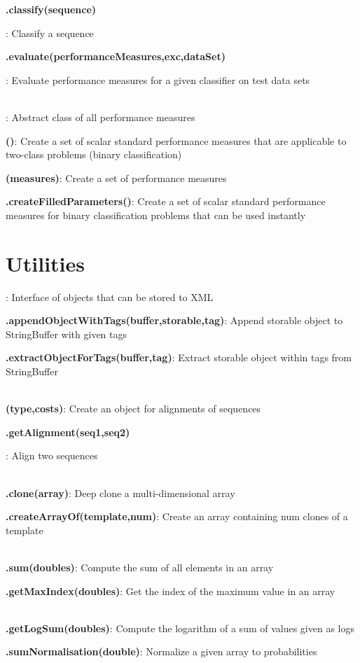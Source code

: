 \documentclass[10pt]{scrartcl}
\newcommand{\entry}[3]{{\item[]\bfseries #1#2}: #3}
\newcommand{\entrys}[3]{\item[\emph{static}] {\bfseries {#1#2}}: #3}
\newcommand{\entryn}[3]{\item[new] {\bfseries {#1#2}}: #3}
\newcommand{\sep}{\\~\vspace{-0.1cm}}
\begin{document}
\begin{flushleft}
\begin{itemize*}
\entry{\AbstractClassifier}{.classify(sequence)}{Classify a sequence}

\entry{\AbstractClassifier}{.evaluate(performanceMeasures,exc,dataSet)}{Evaluate performance measures for a given classifier on test data sets}\sep

\entry{\AbstractPerformanceMeasure}{}{Abstract class of all performance measures}

\entryn{\NumericalPerformanceMeasureParameterSet}{()}{Create a set of scalar standard performance measures that are applicable to two-class problems (binary classification)}

\entryn{\PerformanceMeasureParameterSet}{(measures)}{Create a set of performance measures}

\entrys{\PerformanceMeasureParameterSet}{.createFilledParameters()}{Create a set of scalar standard performance measures for binary classification problems that can be used instantly}

\end{itemize*}

\section{Utilities}

\begin{itemize*}

\entry{\Storable}{}{Interface of objects that can be stored to XML}

\entrys{\XMLParser}{.appendObjectWithTags(buffer,storable,tag)}{Append storable object to StringBuffer with given tags}

\entrys{\XMLParser}{.extractObjectForTags(buffer,tag)}{Extract storable object within tags from StringBuffer}\sep

\entryn{\Alignment}{(type,costs)}{Create an object for alignments of sequences}

\entry{\Alignment}{.getAlignment(seq1,seq2)}{Align two sequences}\sep

\entrys{\ArrayHandler}{.clone(array)}{Deep clone a multi-dimensional array}

\entrys{\ArrayHandler}{.createArrayOf(template,num)}{Create an array containing num clones of a template}\sep

\entrys{\ToolBox}{.sum(doubles)}{Compute the sum of all elements in an array}

\entrys{\ToolBox}{.getMaxIndex(doubles)}{Get the index of the maximum value in an array}\sep

\entrys{\Normalisation}{.getLogSum(doubles)}{Compute the logarithm of a sum of values given as logs}

\entrys{\Normalisation}{.sumNormalisation(double)}{Normalize a given array to probabilities}

\end{itemize*}

\end{flushleft}
\end{document}
